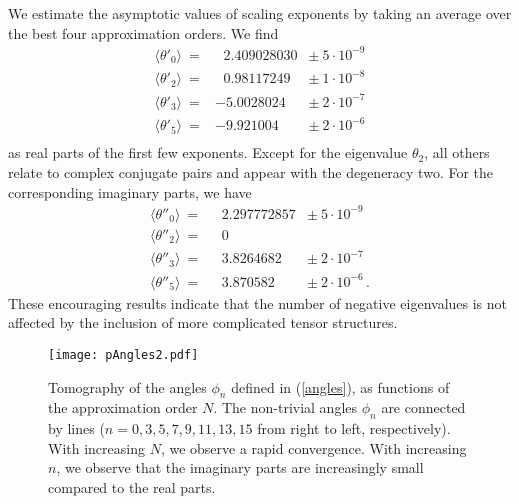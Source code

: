 \documentclass[notitlepage,eqsecnum,bm,amsmath,preprintnumbers,superscriptaddress,nofootinbib,aps,11pt]{revtex4-1}
\def\eq#1{(\ref{#1})}
\begin{document}
We estimate the asymptotic values of scaling exponents by taking an average over the best four  approximation orders. We find
\begin{equation}
\label{theta*}
\begin{array}{rll}
\langle\theta'_0\rangle\ =&\ \ \,2.409028030&\pm\ 5\cdot  10^{-9}\\
\langle\theta'_2 \rangle\ =&\ \ \, 0.98117249 &\pm\ 1 \cdot 10^{-8}\\
\langle\theta'_3 \rangle\ =& -5.0028024 &\pm\ 2\cdot  10^{-7}\\
\langle\theta'_5 \rangle\ =& -9.921004&\pm\ 2\cdot  10^{-6}\\
\end{array}
\end{equation}
as real parts of the first few exponents. Except for the eigenvalue $\theta_2$, all others relate to complex conjugate pairs and appear with the degeneracy two. For the corresponding imaginary parts, we have
\begin{equation}
\label{Imtheta*}
\begin{array}{rll}
\langle\theta''_0\rangle\ =&\ \ \,2.297772857&\pm\ 5\cdot  10^{-9}\\
\langle\theta''_2\rangle\ =&\ \ \,0\\
\langle\theta''_3 \rangle\ =& \ \ \, 3.8264682 &\pm\ 2\cdot  10^{-7}\\
\langle\theta''_5 \rangle\ =& \ \ \, 3.870582 &\pm\ 2\cdot  10^{-6}\,.
\end{array}
\end{equation}
These encouraging results indicate that the number of negative eigenvalues is not affected by the inclusion of more complicated tensor structures.


\begin{figure}[t]
\centering
\begin{center}
\texttt{[image: pAngles2.pdf]}
\caption{\label{pAngles} Tomography of the angles $\phi_n$ defined in \eq{angles}, 
as functions of the approximation order $N$. The non-trivial angles $\phi_n$  are connected by lines ($n=0,3,5,7,9,11,13,15$ from right to left, respectively). With increasing $N$, we observe a rapid convergence. With increasing $n$, we observe that the imaginary parts are increasingly small compared to the real parts.}
\end{center}
\end{figure}
\end{document}
